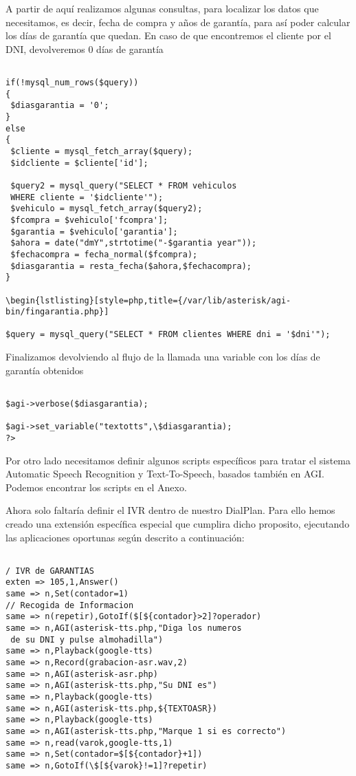 A partir de aquí realizamos algunas consultas, para localizar los datos que necesitamos, es decir, fecha de compra y años de garantía, para así poder calcular los días de garantía que quedan. En caso de que encontremos el cliente por el DNI, devolveremos 0 días de garantía

\begin{lstlisting}[style=php,title={/var/lib/asterisk/agi-bin/fingarantia.php}]

if(!mysql_num_rows($query))
{
 $diasgarantia = '0';
}
else
{
 $cliente = mysql_fetch_array($query);
 $idcliente = $cliente['id'];

 $query2 = mysql_query("SELECT * FROM vehiculos 
 WHERE cliente = '$idcliente'");
 $vehiculo = mysql_fetch_array($query2);
 $fcompra = $vehiculo['fcompra'];
 $garantia = $vehiculo['garantia'];
 $ahora = date("dmY",strtotime("-$garantia year"));
 $fechacompra = fecha_normal($fcompra);
 $diasgarantia = resta_fecha($ahora,$fechacompra);
}

\begin{lstlisting}[style=php,title={/var/lib/asterisk/agi-bin/fingarantia.php}]

$query = mysql_query("SELECT * FROM clientes WHERE dni = '$dni'");

\end{lstlisting}

Finalizamos devolviendo al flujo de la llamada una variable con los días de garantía obtenidos

\begin{lstlisting}[style=php,title={/var/lib/asterisk/agi-bin/fingarantia.php}]

$agi->verbose($diasgarantia);

$agi->set_variable("textotts",\$diasgarantia);
?>

\end{lstlisting}

Por otro lado necesitamos definir algunos scripts específicos para tratar el sistema Automatic Speech Recognition y Text-To-Speech, basados también en AGI. Podemos encontrar los scripts en el Anexo.

Ahora solo faltaría definir el IVR dentro de nuestro DialPlan. Para ello hemos creado una extensión específica especial que cumplira dicho proposito, ejecutando las aplicaciones oportunas según descrito a continuación:

\begin{lstlisting}[style=bash,title={(/etc/asterisk/extensions.conf}]

/ IVR de GARANTIAS
exten => 105,1,Answer()
same => n,Set(contador=1)
// Recogida de Informacion
same => n(repetir),GotoIf($[${contador}>2]?operador)
same => n,AGI(asterisk-tts.php,"Diga los numeros
 de su DNI y pulse almohadilla")
same => n,Playback(google-tts)
same => n,Record(grabacion-asr.wav,2)
same => n,AGI(asterisk-asr.php)
same => n,AGI(asterisk-tts.php,"Su DNI es")
same => n,Playback(google-tts)
same => n,AGI(asterisk-tts.php,${TEXTOASR})
same => n,Playback(google-tts)
same => n,AGI(asterisk-tts.php,"Marque 1 si es correcto")
same => n,read(varok,google-tts,1)
same => n,Set(contador=$[${contador}+1])
same => n,GotoIf(\$[${varok}!=1]?repetir)

\end{lstlisting}

